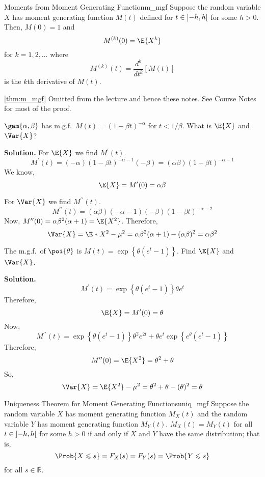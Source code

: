 \begin{Theorem}{Moments from Moment Generating Function}{m_mgf}
    Suppose the random variable $ X $ has moment generating
    function $ M(t) $ defined for $ t\in\interval[open]{-h}{h} $
    for some $ h>0 $. Then, $ M(0)=1 $ and
    \[ M^{(k)}(0)=\E{X^k} \]
    for $ k=1,2,\ldots $ where
    \[ M^{(k)}(t)=\frac{d^k}{dt^k} \left[ M(t) \right] \]
    is the $ k $th derivative of $ M(t) $.
\end{Theorem}
\begin{Proof}{\ref{thm:m_mgf}}{}
    Omitted from the lecture and hence these notes.
    See Course Notes for most of the proof.
\end{Proof}

\begin{Example}{}{}
    $ \gam{\alpha,\beta}$ has m.g.f.\
    $ \displaystyle  M(t)=(1-\beta t)^{-\alpha} $
    for $ t<1/\beta $. What is $ \E{X} $ and $ \Var{X} $?

    \textbf{Solution.} For $ \E{X} $ we find $ M^\prime(t) $.
    \[ M^\prime(t)=(-\alpha)(1-\beta t)^{-\alpha-1}(-\beta)=
        (\alpha \beta)(1-\beta t)^{-\alpha-1} \]
    We know,
    \[ \E{X}=M^\prime(0)=\alpha\beta \]

    For $ \Var{X} $ we find $ M^{\prime\prime}(t) $.
    \[ M^{\prime\prime}(t)=(\alpha\beta)(-\alpha-1)(-\beta)(1-\beta t)^{-\alpha-2} \]
    Now, $ M^{\prime\prime}(0)=\alpha\beta^2(\alpha+1) =\E{X^2} $. Therefore,
    \[ \Var{X}=\E*{X^2}-\mu^2=\alpha\beta^2(\alpha+1)-(\alpha\beta)^2=\alpha\beta^2 \]
\end{Example}

\begin{Example}{}{}
    The m.g.f.\ of $ \poi{\theta} $ is $ \displaystyle  M(t)=\exp\left\{ \theta(e^t-1)\right\} $.
    Find $ \E{X} $ and $ \Var{X} $.

    \textbf{Solution.}
    \[ M^\prime(t)=\exp\left\{ \theta(e^t-1)\right\}\theta e^t \]
    Therefore,
    \[ \E{X}=M^\prime(0)=\theta \]
    Now,
    \[ M^{\prime\prime}(t)=
        \exp\left\{ \theta(e^t-1)\right\}\theta^2 e^{2t}+\theta e^t
        \exp\left\{ e^\theta(e^t-1)\right\} \]
    Therefore,
    \[ M^{\prime\prime}(0)=\E{X^2}=\theta^2+\theta \]
    So,
    \[ \Var{X}=\E{X^2}-\mu^2=\theta^2+\theta-(\theta)^2=\theta \]
\end{Example}

\begin{Theorem}{Uniqueness Theorem for Moment Generating Functions}{uniq_mgf}
    Suppose the random variable $ X $ has moment generating function
    $ M_X(t) $ and the random variable $ Y $ has
    moment generating function $ M_Y(t) $.
    $ M_X(t) = M_Y(t) $ for all $ t\in\interval[open]{-h}{h} $
    for some $ h>0 $ if and only if $ X $ and $ Y $ have the same distribution;
    that is,
    \[ \Prob{X\leqslant s}=F_X(s)=F_Y(s)=\Prob{Y\leqslant s} \]
    for all $ s\in\mathbb{R} $.
\end{Theorem}

